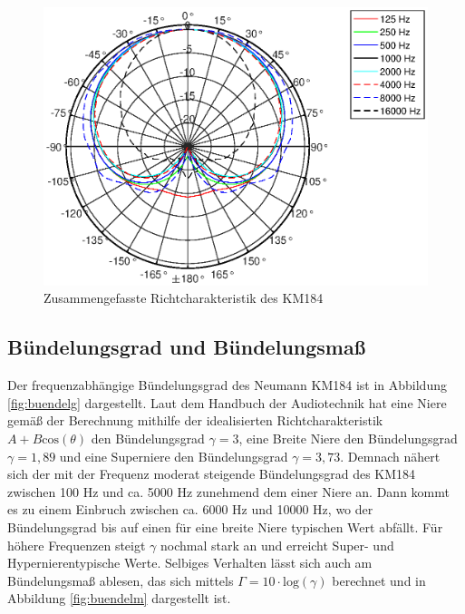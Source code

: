 \begin{figure}[bth]
    \centering
    \vspace{-1em}
    \includegraphics[width=0.9\linewidth]{Figures/KM184_allfreqs}
    \vspace{-3em}
    \caption{Zusammengefasste Richtcharakteristik des KM184}
    \label{fig:Polar_allfreqs}
\end{figure}


\subsection{Bündelungsgrad und Bündelungsmaß}
\label{subsec:e}

Der frequenzabhängige Bündelungsgrad des Neumann KM184 ist in Abbildung \ref{fig:buendelg} dargestellt. 
Laut dem Handbuch der Audiotechnik \cite{Weinzierl08} hat eine Niere gemäß der Berechnung mithilfe der idealisierten Richtcharakteristik $A + B \mathrm{cos}(\theta)$ den Bündelungsgrad $\gamma = 3$, eine Breite Niere den Bündelungsgrad $\gamma = 1,89$ und eine Superniere den Bündelungsgrad $\gamma = 3,73$.
Demnach nähert sich der mit der Frequenz moderat steigende Bündelungsgrad des KM184 zwischen 100 Hz und ca. 5000 Hz zunehmend dem einer Niere an.
Dann kommt es zu einem Einbruch zwischen ca. 6000 Hz und 10000 Hz, wo der Bündelungsgrad bis auf einen für eine breite Niere typischen Wert abfällt. 
Für höhere Frequenzen steigt $\gamma$ nochmal stark an und erreicht  Super- und Hypernierentypische Werte. 
Selbiges Verhalten lässt sich auch am Bündelungsmaß ablesen, das sich mittels $\Gamma = 10\cdot \mathrm{log}(\gamma)$ berechnet
und in Abbildung \ref{fig:buendelm} dargestellt ist.


